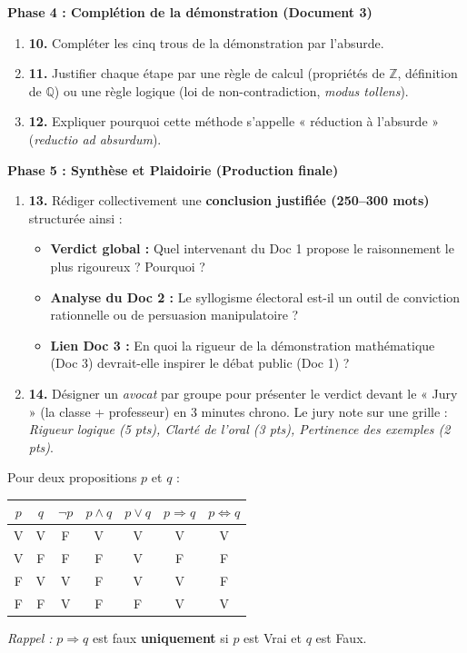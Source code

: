 \documentclass[11pt]{article}
\newcounter{popsec}
\newcounter{popsub}
\newcommand{\courssub}[1]{%
  \stepcounter{popsub}%
  \par\vspace{9pt}\noindent{\popxbold\fontsize{11.5}{13}\selectfont\color{popink}{\color{poporange}\thepopsec.\thepopsub}\hspace{6pt}#1}\par\nopagebreak\vspace{4pt}
}
\begin{document}
\textbf{Phase 4 : Complétion de la démonstration (Document 3)}
\begin{enumerate}
    \item \textbf{10.} Compléter les cinq trous de la démonstration par l'absurde.
    \item \textbf{11.} Justifier chaque étape par une règle de calcul (propriétés de $\mathbb{Z}$, définition de $\mathbb{Q}$) ou une règle logique (loi de non-contradiction, \emph{modus tollens}).
    \item \textbf{12.} Expliquer pourquoi cette méthode s'appelle « réduction à l'absurde » (\emph{reductio ad absurdum}).
\end{enumerate}

\textbf{Phase 5 : Synthèse et Plaidoirie (Production finale)}
\begin{enumerate}
    \item \textbf{13.} Rédiger collectivement une \textbf{conclusion justifiée (250--300 mots)} structurée ainsi :
    \begin{itemize}
        \item \textbf{Verdict global :} Quel intervenant du Doc 1 propose le raisonnement le plus rigoureux ? Pourquoi ?
        \item \textbf{Analyse du Doc 2 :} Le syllogisme électoral est-il un outil de conviction rationnelle ou de persuasion manipulatoire ?
        \item \textbf{Lien Doc 3 :} En quoi la rigueur de la démonstration mathématique (Doc 3) devrait-elle inspirer le débat public (Doc 1) ?
    \end{itemize}
    \item \textbf{14.} Désigner un \emph{avocat} par groupe pour présenter le verdict devant le « Jury » (la classe + professeur) en 3 minutes chrono. Le jury note sur une grille : \emph{Rigueur logique (5 pts), Clarté de l'oral (3 pts), Pertinence des exemples (2 pts)}.
\end{enumerate}

\courssub{Ressources à mobiliser}
\begin{definition}
Pour deux propositions $p$ et $q$ :
\begin{center}
\begin{tabular}{|c|c|c|c|c|c|c|}\hline
$p$ & $q$ & $\neg p$ & $p \land q$ & $p \lor q$ & $p \Rightarrow q$ & $p \Leftrightarrow q$ \\ \hline
V & V & F & V & V & V & V \\
V & F & F & F & V & F & F \\
F & V & V & F & V & V & F \\
F & F & V & F & F & V & V \\ \hline
\end{tabular}
\end{center}
\emph{Rappel :} $p \Rightarrow q$ est faux \textbf{uniquement} si $p$ est Vrai et $q$ est Faux.
\end{definition}
\end{document}

